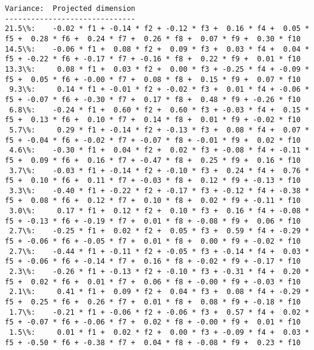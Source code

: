 \documentclass[11pt]{article}
\begin{document}
    \begin{Verbatim}[commandchars=\\\{\}]
Variance:  Projected dimension
------------------------------
21.5\%:    -0.02 * f1 + -0.14 * f2 + -0.12 * f3 +  0.16 * f4 +  0.05 * f5 +  0.28 * f6 +  0.24 * f7 +  0.26 * f8 +  0.07 * f9 +  0.30 * f10
14.5\%:    -0.06 * f1 +  0.08 * f2 +  0.09 * f3 +  0.03 * f4 +  0.04 * f5 + -0.22 * f6 + -0.17 * f7 + -0.16 * f8 +  0.22 * f9 +  0.01 * f10
13.3\%:     0.08 * f1 +  0.03 * f2 +  0.00 * f3 + -0.25 * f4 + -0.09 * f5 +  0.05 * f6 + -0.00 * f7 +  0.08 * f8 +  0.15 * f9 +  0.07 * f10
 9.3\%:     0.14 * f1 + -0.01 * f2 + -0.02 * f3 +  0.01 * f4 + -0.06 * f5 + -0.07 * f6 + -0.30 * f7 +  0.17 * f8 +  0.48 * f9 + -0.26 * f10
 6.8\%:    -0.24 * f1 +  0.60 * f2 +  0.60 * f3 + -0.03 * f4 +  0.15 * f5 +  0.13 * f6 +  0.10 * f7 +  0.14 * f8 +  0.01 * f9 + -0.02 * f10
 5.7\%:     0.29 * f1 + -0.14 * f2 + -0.13 * f3 +  0.08 * f4 +  0.07 * f5 + -0.04 * f6 + -0.02 * f7 + -0.07 * f8 + -0.01 * f9 +  0.02 * f10
 4.6\%:    -0.30 * f1 +  0.04 * f2 +  0.02 * f3 + -0.08 * f4 + -0.11 * f5 +  0.09 * f6 +  0.16 * f7 + -0.47 * f8 +  0.25 * f9 +  0.16 * f10
 3.7\%:    -0.03 * f1 + -0.14 * f2 + -0.10 * f3 +  0.24 * f4 +  0.76 * f5 +  0.10 * f6 +  0.11 * f7 + -0.03 * f8 +  0.12 * f9 + -0.13 * f10
 3.3\%:    -0.40 * f1 + -0.22 * f2 + -0.17 * f3 + -0.12 * f4 + -0.38 * f5 +  0.08 * f6 +  0.12 * f7 +  0.10 * f8 +  0.02 * f9 + -0.11 * f10
 3.0\%:     0.17 * f1 +  0.12 * f2 +  0.10 * f3 +  0.16 * f4 + -0.08 * f5 + -0.13 * f6 + -0.19 * f7 +  0.01 * f8 + -0.08 * f9 +  0.06 * f10
 2.7\%:    -0.25 * f1 +  0.02 * f2 +  0.05 * f3 +  0.59 * f4 + -0.29 * f5 + -0.06 * f6 + -0.05 * f7 +  0.01 * f8 +  0.00 * f9 + -0.02 * f10
 2.7\%:    -0.44 * f1 + -0.11 * f2 + -0.05 * f3 + -0.14 * f4 +  0.03 * f5 + -0.06 * f6 + -0.14 * f7 +  0.16 * f8 + -0.02 * f9 + -0.17 * f10
 2.3\%:    -0.26 * f1 + -0.13 * f2 + -0.10 * f3 + -0.31 * f4 +  0.20 * f5 +  0.02 * f6 +  0.01 * f7 +  0.06 * f8 + -0.00 * f9 + -0.03 * f10
 2.1\%:     0.41 * f1 +  0.09 * f2 +  0.04 * f3 +  0.08 * f4 + -0.29 * f5 +  0.25 * f6 +  0.26 * f7 +  0.01 * f8 +  0.08 * f9 + -0.18 * f10
 1.7\%:    -0.21 * f1 + -0.06 * f2 + -0.06 * f3 +  0.57 * f4 +  0.02 * f5 + -0.07 * f6 + -0.06 * f7 +  0.02 * f8 + -0.00 * f9 +  0.01 * f10
 1.5\%:     0.01 * f1 +  0.02 * f2 +  0.00 * f3 + -0.09 * f4 +  0.03 * f5 + -0.50 * f6 + -0.38 * f7 +  0.04 * f8 + -0.08 * f9 +  0.23 * f10

    \end{Verbatim}
\end{document}
